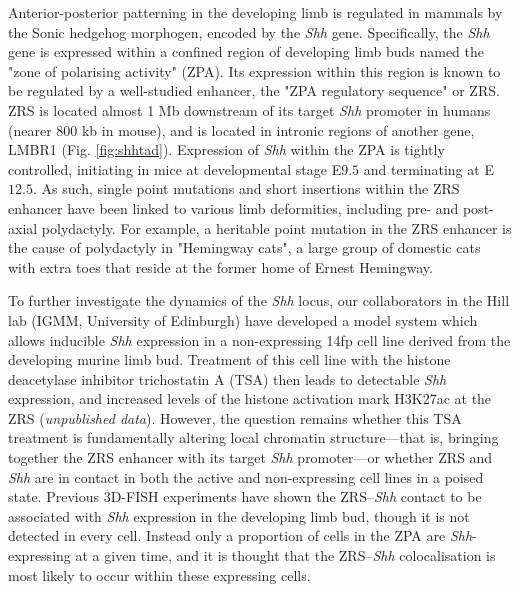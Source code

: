 \documentclass[a4paper,11pt,oneside]{book}
\begin{document}

Anterior-posterior patterning in the developing limb is regulated in mammals by the Sonic hedgehog morphogen, encoded by the \emph{Shh} gene.\cite{Anderson2012} Specifically, the \emph{Shh} gene is expressed within a confined region of developing limb buds named the "zone of polarising activity" (ZPA). Its expression within this region is known to be regulated by a well-studied enhancer, the "ZPA regulatory sequence" or ZRS.\cite{Hill2013a} ZRS is located almost 1 Mb downstream of its target \emph{Shh} promoter in humans (nearer 800 kb in mouse), and is located in intronic regions of another gene, LMBR1 (Fig. \ref{fig:shhtad}).\cite{Hill2013a, Laurell2012} Expression of \emph{Shh} within the ZPA is tightly controlled, initiating in mice at developmental stage E$9.5$ and terminating at E$12.5$.\cite{Amano2009} As such, single point mutations and short insertions within the ZRS enhancer have been linked to various limb deformities, including pre- and post-axial polydactyly.\cite{Anderson2012, Lettice2008, Laurell2012} For example, a heritable point mutation in the ZRS enhancer is the cause of polydactyly in "Hemingway cats", a large group of domestic cats with extra toes that reside at the former home of Ernest Hemingway.\cite{Lettice2008, Zeller2009}  

To further investigate the dynamics of the \emph{Shh} locus, our collaborators in the Hill lab (IGMM, University of Edinburgh) have developed a model system which allows inducible \emph{Shh} expression in a non-expressing 14fp cell line derived from the developing murine limb bud. Treatment of this cell line with the histone deacetylase inhibitor trichostatin A (TSA) then leads to detectable \emph{Shh} expression, and increased levels of the histone activation mark H3K27ac at the ZRS (\emph{unpublished data}). However, the question remains whether this TSA treatment is fundamentally altering local chromatin structure---that is, bringing together the ZRS enhancer with its target \emph{Shh} promoter---or whether ZRS and \emph{Shh} are in contact in both the active and non-expressing cell lines in a poised state. Previous 3D-FISH experiments have shown the ZRS--\emph{Shh} contact  to be associated with \emph{Shh} expression in the developing limb bud, though it is not detected in every cell.\cite{Amano2009, Hill2013a} Instead only a proportion of cells in the ZPA are \emph{Shh}-expressing at a given time, and it is thought that the ZRS--\emph{Shh} colocalisation is most likely to occur within these expressing cells.\cite{Amano2009}
\end{document}
